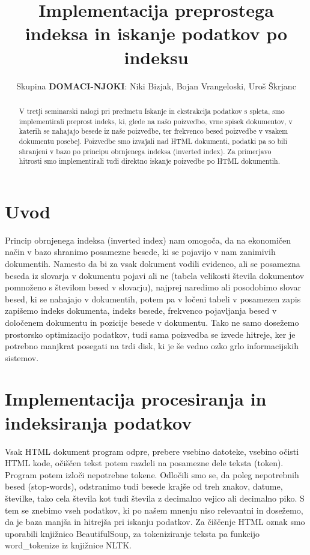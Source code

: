 \documentclass[conference]{IEEEtran}
\begin{document}
	
	\title{Implementacija preprostega indeksa in iskanje podatkov po indeksu}
	
	\author{Skupina \textbf{DOMACI-NJOKI}: Niki Bizjak, Bojan Vrangeloski, Uroš Škrjanc}


	
	\maketitle
	
	\begin{abstract}
		V tretji seminarski nalogi pri predmetu Iskanje in ekstrakcija podatkov s spleta, smo implementirali preprost indeks, ki, glede na našo poizvedbo, vrne  spisek dokumentov, v katerih se nahajajo besede iz naše poizvedbe, ter frekvenco besed poizvedbe v vsakem dokumentu posebej. Poizvedbe smo izvajali nad HTML dokumenti, podatki pa so bili shranjeni v bazo po principu obrnjenega indeksa (inverted index). Za primerjavo hitrosti smo implementirali tudi direktno iskanje poizvedbe po HTML dokumentih. 
	\end{abstract}
	
	\IEEEpeerreviewmaketitle
	
	\section{Uvod}
	
	Princip obrnjenega indeksa (inverted index) nam omogoča, da na ekonomičen način v bazo shranimo posamezne besede, ki se pojavijo v nam zanimivih dokumentih. Namesto da bi za vsak dokument vodili evidenco, ali se posamezna beseda iz slovarja v dokumentu pojavi ali ne (tabela velikosti števila dokumentov pomnoženo s številom besed v slovarju), najprej naredimo ali posodobimo slovar besed, ki se nahajajo v dokumentih, potem pa v ločeni tabeli v posamezen zapis zapišemo indeks dokumenta, indeks besede, frekvenco pojavljanja besed v določenem dokumentu in pozicije besede v dokumentu. Tako ne samo dosežemo prostorsko optimizacijo podatkov, tudi sama poizvedba se izvede hitreje, ker je potrebno manjkrat posegati na trdi disk, ki je še vedno ozko grlo informacijskih sistemov.
	
	\section{Implementacija procesiranja in indeksiranja podatkov}
	
	Vsak HTML dokument program odpre, prebere vsebino datoteke, vsebino očisti HTML kode, očiščen tekst potem razdeli na posamezne dele teksta (token). Program potem izloči nepotrebne tokene. Odločili smo se, da poleg nepotrebnih besed (stop-words), odstranimo tudi besede krajše od treh znakov, datume, številke, tako cela števila kot tudi števila z decimalno vejico ali decimalno piko. S tem se znebimo vseh podatkov, ki po našem mnenju niso relevantni in dosežemo, da je baza manjša in hitrejša pri iskanju podatkov. Za čiščenje HTML oznak smo uporabili knjižnico BeautifulSoup, za tokeniziranje teksta pa funkcijo word\_tokenize iz knjižnice NLTK.
\end{document}
